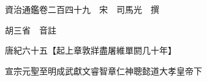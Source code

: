 










 


 
 


 

  
  
  
  
  





  
  
  
  
  
 
  

  

  
  
  



  

 
 

  
   




  

  
  


  　　資治通鑑卷二百四十九　宋　司馬光　撰

　　胡三省　音註

　　唐紀六十五【起上章敦牂盡屠維單閼几十年】

　　宣宗元聖至明成武獻文睿智章仁神聰懿道大孝皇帝下

